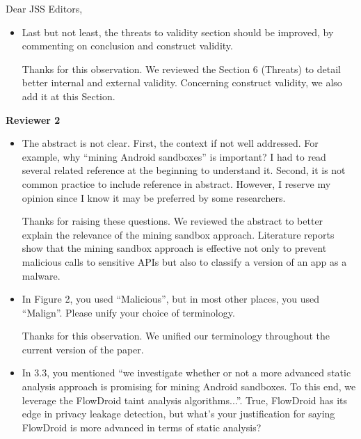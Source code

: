 \documentclass[12pt,english]{scrartcl}
\begin{document}
\begin{letter}{Dear JSS Editors,}
\begin{itemize}
\item Last but not least, the threats to validity section should be improved, by commenting on conclusion and construct validity.


\vspace{0.2cm}

{\color{blue}{\bf Answer.} Thanks for this observation. We reviewed the Section 6 (Threats) to detail better internal and external validity. Concerning construct validity, we also add it at this Section.}


\end{itemize}

{\bf Reviewer 2}

\begin{itemize}

\item The abstract is not clear. First, the context if not well addressed.
  For example, why ``mining Android sandboxes'' is important? I had to read
  several related reference at the beginning to understand it. Second, it is not common practice to 
include reference in abstract. However, I reserve my opinion since I know it may be preferred by some researchers.


\vspace{0.2cm}

{\color{blue}{\bf Answer.} Thanks for raising these questions. We reviewed the abstract
  to better explain the relevance of the mining sandbox approach. Literature reports
  show that the mining sandbox approach is effective  not only to prevent malicious
  calls to sensitive APIs but also to classify a version of an app as a malware.}

\vspace{0.2cm}

\item In Figure 2, you used ``Malicious'', but in most other places, you used ``Malign''.
  Please unify your choice of terminology.


\vspace{0.2cm}

{\color{blue}{\bf Answer.} Thanks for this observation. We unified our terminology throughout the current
  version of the paper.}

\vspace{0.2cm}

\item In 3.3, you mentioned ``we investigate whether or not a more advanced static analysis approach is promising for mining 
Android sandboxes. To this end, we leverage the FlowDroid taint analysis algorithms...''. True, FlowDroid has its edge 
in privacy leakage detection, but what's your justification for saying FlowDroid is more advanced in terms of static analysis?



\end{itemize}
\end{letter}
\end{document}
